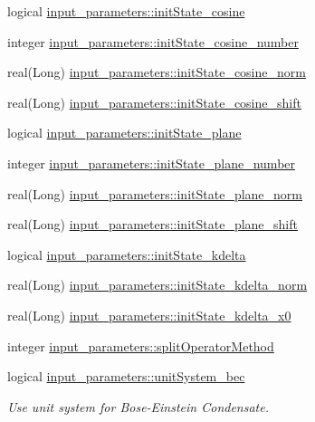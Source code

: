 \begin{DoxyCompactItemize}
\item 
logical \hyperlink{namespaceinput__parameters_a794b8486b7ecd6258448887bce533681}{input\_\-parameters::initState\_\-cosine}
\item 
integer \hyperlink{namespaceinput__parameters_ad5ff3d9c110be99ed08bbe970f1630c8}{input\_\-parameters::initState\_\-cosine\_\-number}
\item 
real(Long) \hyperlink{namespaceinput__parameters_a51d2cc916f531fadef1a6f0729644174}{input\_\-parameters::initState\_\-cosine\_\-norm}
\item 
real(Long) \hyperlink{namespaceinput__parameters_ac3a5530df841dc82b4819f34f1e44980}{input\_\-parameters::initState\_\-cosine\_\-shift}
\item 
logical \hyperlink{namespaceinput__parameters_a727a13be305b5dde7955fd2d02f955e4}{input\_\-parameters::initState\_\-plane}
\item 
integer \hyperlink{namespaceinput__parameters_a876ac6edc93b733aeb66f54aca167741}{input\_\-parameters::initState\_\-plane\_\-number}
\item 
real(Long) \hyperlink{namespaceinput__parameters_a22ba3f1343580a0db34433e32279e365}{input\_\-parameters::initState\_\-plane\_\-norm}
\item 
real(Long) \hyperlink{namespaceinput__parameters_a97253a3c66d919b8a99dd33c633d3bd8}{input\_\-parameters::initState\_\-plane\_\-shift}
\item 
logical \hyperlink{namespaceinput__parameters_aae45dd03716b9ad9a0600a9d9a798935}{input\_\-parameters::initState\_\-kdelta}
\item 
real(Long) \hyperlink{namespaceinput__parameters_a1b2e5c088ab1d39d896586d7fb18b142}{input\_\-parameters::initState\_\-kdelta\_\-norm}
\item 
real(Long) \hyperlink{namespaceinput__parameters_a65eb9165c6a1fd054daefc2a96e7ae2a}{input\_\-parameters::initState\_\-kdelta\_\-x0}
\item 
integer \hyperlink{namespaceinput__parameters_a127f71f45eade1f05ced1535e88c771d}{input\_\-parameters::splitOperatorMethod}
\item 
logical \hyperlink{namespaceinput__parameters_a716cb07ce1fca722dacc327ddc4011fd}{input\_\-parameters::unitSystem\_\-bec}
\begin{DoxyCompactList}\small\item\em Use unit system for Bose-\/Einstein Condensate. \item\end{DoxyCompactList}\item 

\end{DoxyCompactItemize}
